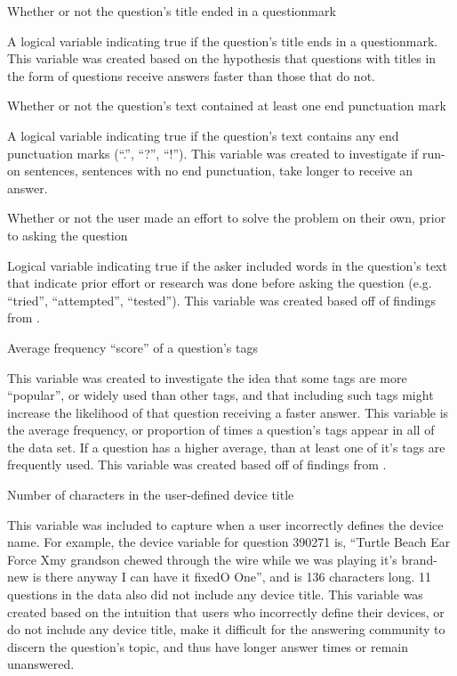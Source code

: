 \documentclass{article}
\begin{document}
Whether or not the question's title ended in a questionmark

A logical variable indicating true if the question's title ends in a questionmark. This variable was created based on the hypothesis that questions with titles in the form of questions receive answers faster than those that do not. 
  
Whether or not the question's text contained at least one end punctuation mark

A logical variable indicating true if the question’s text contains any end punctuation marks (``.'', ``?'', ``!''). This variable was created to investigate if run-on sentences, sentences with no end punctuation, take longer to receive an answer. 

Whether or not the user made an effort to solve the problem on their own, prior to asking the question

Logical variable indicating true if the asker included words in the question's text that indicate prior effort or research was done before asking the question (e.g. ``tried'', ``attempted'', ``tested''). This variable was created based off of findings from \cite{Bhat2014}. 

Average frequency ``score'' of a question's tags

This variable was created to investigate the idea that some tags are more ``popular'', or widely used than other tags, and that including such tags might increase the likelihood of that question receiving a faster answer. This variable is the average frequency, or proportion of times a question's tags appear in all of the data set. If a question has a higher average, than at least one of it's tags are frequently used. This variable was created based off of findings from \cite{Bhat2014}. 

Number of characters in the user-defined device title

This variable was included to capture when a user incorrectly defines the device name. For example, the device variable for question 390271 is, “Turtle Beach Ear Force Xmy grandson chewed through the wire while we was playing it's brand-new is there anyway I can have it fixedO One”, and is 136 characters long. 11 questions in the data also did not include any device title. This variable was created based on the intuition that users who incorrectly define their devices, or do not include any device title, make it difficult for the answering community to discern the question's topic, and thus have longer answer times or remain unanswered.
\end{document}
